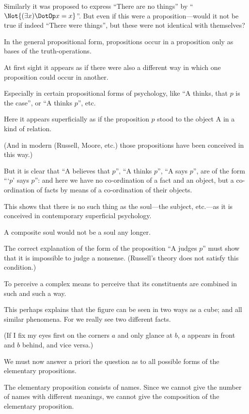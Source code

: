 {Similarly it was proposed to express ``There are
no things'' by ``$\Not{(\exists x) \DotOp x = x}$''. But even if this
were a proposition---would it not be true if indeed
``There were things'', but these were not identical
with themselves?}


{In the general propositional form, propositions
occur in a proposition only as bases of the truth-operations.}


{At first sight it appears as if there were also a
different way in which one proposition could occur
in another.

Especially in certain propositional forms of
psychology, like ``A thinks, that $p$ is the case'',
or ``A thinks $p$'', etc.

Here it appears superficially as if the proposition
$p$ stood to the object A in a kind of relation.

(And in modern  (Russell, Moore,
etc.) those propositions have been conceived in
this way.)}


{But it is clear that ``A believes that $p$'', ``A
thinks $p$'', ``A says $p$'', are of the form ```$p$' says
$p$'': and here we have no co-ordination of a fact
and an object, but a co-ordination of facts by
means of a co-ordination of their objects.}


{This shows that there is no such thing as the
soul---the subject, etc.---as it is conceived in contemporary
superficial psychology.

A composite soul would not be a soul any
longer.}


{The correct explanation of the form of the
proposition ``A judges $p$'' must show that it is
impossible to judge a nonsense. (Russell's theory
does not satisfy this condition.)}


{To perceive a complex means to perceive that
its constituents are combined in such and such a
way.

This perhaps explains that the figure
can be seen in two ways as a cube; and all similar
phenomena. For we really see two different facts.

(If I fix my eyes first on the corners $a$ and only
glance at $b$, $a$ appears in front and $b$ behind, and
vice versa.)}


{We must now answer a priori the question
as to all possible forms of the elementary propositions.

The elementary proposition consists of names.
Since we cannot give the number of names with
different meanings, we cannot give the composition
of the elementary proposition.}


